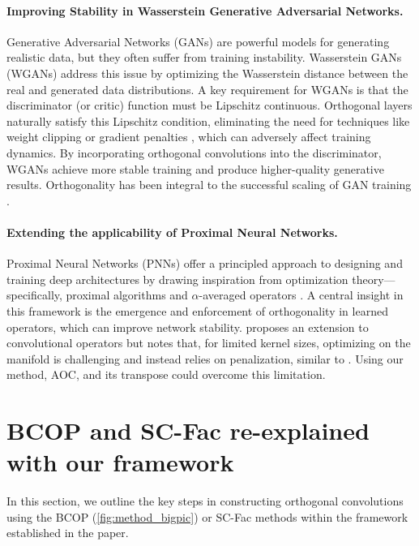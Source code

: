     \paragraph{Improving Stability in Wasserstein Generative Adversarial Networks.}
    Generative Adversarial Networks (GANs) are powerful models for generating realistic data, but they often suffer from training instability. Wasserstein GANs (WGANs) \cite{arjovsky2017wasserstein} address this issue by optimizing the Wasserstein distance between the real and generated data distributions. A key requirement for WGANs is that the discriminator (or critic) function must be Lipschitz continuous. Orthogonal layers naturally satisfy this Lipschitz condition, eliminating the need for techniques like weight clipping or gradient penalties \cite{gulrajani2017improved}, which can adversely affect training dynamics. By incorporating orthogonal convolutions into the discriminator, WGANs achieve more stable training \cite{miyato2018spectral, muller2019orthogonal} and produce higher-quality generative results. Orthogonality has been integral to the successful scaling of GAN training \cite{brock2018large}. %

\paragraph{Extending the applicability of Proximal Neural Networks.}
Proximal Neural Networks (PNNs) offer a principled approach to designing and training deep architectures by drawing inspiration from optimization theory—specifically, proximal algorithms and $\alpha$-averaged operators \cite{hasannasab2020parseval, combettes2020lipschitz}. A central insight in this framework is the emergence and enforcement of orthogonality in learned operators, which can improve network stability. \cite{hertrich2021convolutional} proposes an extension to convolutional operators but notes that, for limited kernel sizes, optimizing on the manifold is challenging and instead relies on penalization, similar to \cite{wang_orthogonal_2020}. Using our method, AOC, and its transpose could overcome this limitation.

\section{BCOP and SC-Fac re-explained with our framework}\label{ap:BCOP_detail}
In this section, we  outline the key steps in constructing orthogonal convolutions using  the BCOP (\cref{fig:method_bigpic}) or SC-Fac methods within the framework established in the paper.


